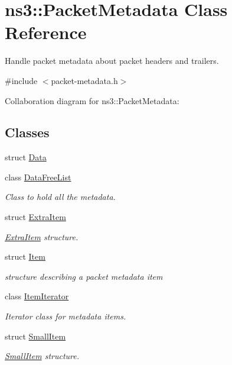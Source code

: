 \hypertarget{classns3_1_1PacketMetadata}{}\section{ns3\+:\+:Packet\+Metadata Class Reference}
\label{classns3_1_1PacketMetadata}


Handle packet metadata about packet headers and trailers.  




{\ttfamily \#include $<$packet-\/metadata.\+h$>$}



Collaboration diagram for ns3\+:\+:Packet\+Metadata\+:
\subsection*{Classes}
\begin{DoxyCompactItemize}
\item 
struct \hyperlink{structns3_1_1PacketMetadata_1_1Data}{Data}
\item 
class \hyperlink{classns3_1_1PacketMetadata_1_1DataFreeList}{Data\+Free\+List}
\begin{DoxyCompactList}\small\item\em Class to hold all the metadata. \end{DoxyCompactList}\item 
struct \hyperlink{structns3_1_1PacketMetadata_1_1ExtraItem}{Extra\+Item}
\begin{DoxyCompactList}\small\item\em \hyperlink{structns3_1_1PacketMetadata_1_1ExtraItem}{Extra\+Item} structure. \end{DoxyCompactList}\item 
struct \hyperlink{structns3_1_1PacketMetadata_1_1Item}{Item}
\begin{DoxyCompactList}\small\item\em structure describing a packet metadata item \end{DoxyCompactList}\item 
class \hyperlink{classns3_1_1PacketMetadata_1_1ItemIterator}{Item\+Iterator}
\begin{DoxyCompactList}\small\item\em Iterator class for metadata items. \end{DoxyCompactList}\item 
struct \hyperlink{structns3_1_1PacketMetadata_1_1SmallItem}{Small\+Item}
\begin{DoxyCompactList}\small\item\em \hyperlink{structns3_1_1PacketMetadata_1_1SmallItem}{Small\+Item} structure. \end{DoxyCompactList}\end{DoxyCompactItemize}
